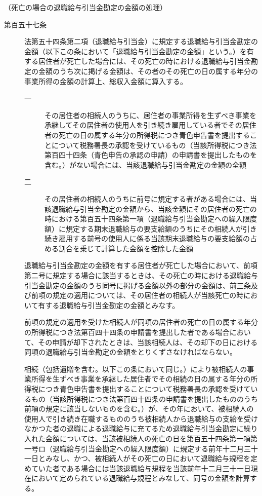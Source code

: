 \documentclass[twocolumn,a4j,10pt]{ltjtarticle}
\begin{document}
\noindent\hspace{10pt}（死亡の場合の退職給与引当金勘定の金額の処理）
\begin{description}
\item[第百五十七条]法第五十四条第二項（退職給与引当金）に規定する退職給与引当金勘定の金額（以下この条において「退職給与引当金勘定の金額」という。）を有する居住者が死亡した場合には、その死亡の時における退職給与引当金勘定の金額のうち次に掲げる金額は、その者のその死亡の日の属する年分の事業所得の金額の計算上、総収入金額に算入する。
\begin{description}
\item[一]その居住者の相続人のうちに、居住者の事業所得を生ずべき事業を承継してその居住者の使用人を引き続き雇用している者でその居住者の死亡の日の属する年分の所得税につき青色申告書を提出することについて税務署長の承認を受けているもの（当該所得税につき法第百四十四条（青色申告の承認の申請）の申請書を提出したものを含む。）がない場合には、当該退職給与引当金勘定の金額の全額
\item[二]その居住者の相続人のうちに前号に規定する者がある場合には、当該退職給与引当金勘定の金額から、当該金額にその居住者の死亡の時における第百五十四条第一項（退職給与引当金勘定への繰入限度額）に規定する期末退職給与の要支給額のうちにその相続人が引き続き雇用する前号の使用人に係る当該期末退職給与の要支給額の占める割合を乗じて計算した金額を控除した金額
\end{description}
\item[]退職給与引当金勘定の金額を有する居住者が死亡した場合において、前項第二号に規定する場合に該当するときは、その死亡の時における退職給与引当金勘定の金額のうち同号に掲げる金額以外の部分の金額は、前三条及び前項の規定の適用については、その居住者の相続人が当該死亡の時において有する退職給与引当金勘定の金額とみなす。
\item[]前項の規定の適用を受けた相続人が同項の居住者の死亡の日の属する年分の所得税につき法第百四十四条の申請書を提出した者である場合において、その申請が却下されたときは、当該相続人は、その却下の日における同項の退職給与引当金勘定の金額をとりくずさなければならない。
\item[]相続（包括遺贈を含む。以下この条において同じ。）により被相続人の事業所得を生ずべき事業を承継した居住者でその相続の日の属する年分の所得税につき青色申告書を提出することについて税務署長の承認を受けているもの（当該所得税につき法第百四十四条の申請書を提出したもののうち前項の規定に該当しないものを含む。）が、その年において、被相続人の使用人で引き続き在職するもののうち被相続人から退職給与の支給を受けなかつた者の退職による退職給与に充てるため退職給与引当金勘定に繰り入れた金額については、当該被相続人の死亡の日を第百五十四条第一項第一号ロ（退職給与引当金勘定への繰入限度額）に規定する前年十二月三十一日とみなし、かつ、被相続人がその死亡の日において退職給与規程を定めていた者である場合には当該退職給与規程を当該前年十二月三十一日現在において定められている退職給与規程とみなして、同号の金額を計算する。

\end{description}
\end{document}
